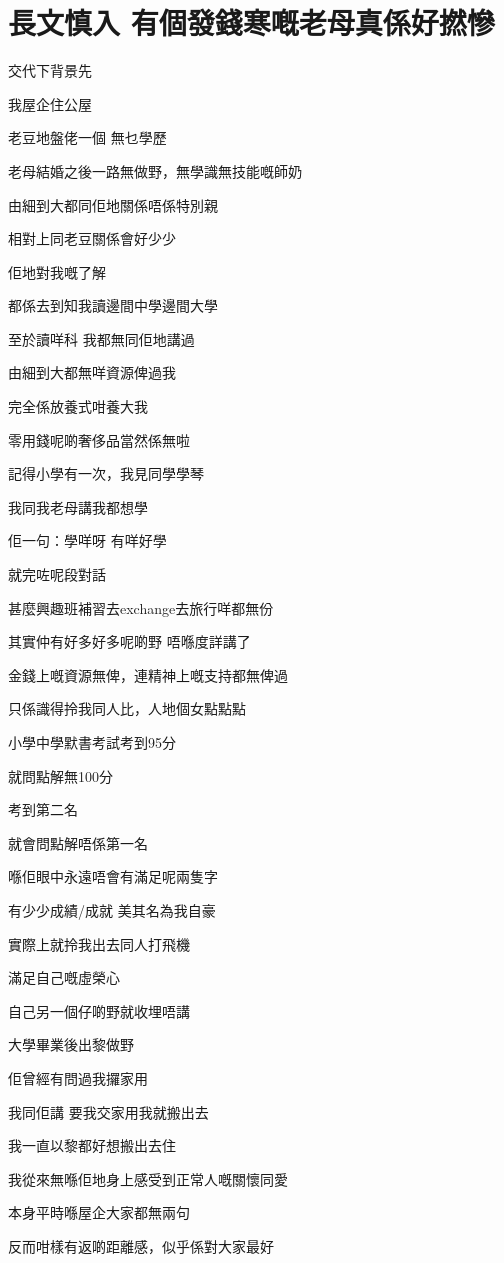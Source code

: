 \chapter{長文慎入 有個發錢寒嘅老母真係好撚慘}

交代下背景先

我屋企住公屋

老豆地盤佬一個 無乜學歷

老母結婚之後一路無做野，無學識無技能嘅師奶

由細到大都同佢地關係唔係特別親

相對上同老豆關係會好少少

佢地對我嘅了解

都係去到知我讀邊間中學邊間大學

至於讀咩科 我都無同佢地講過

由細到大都無咩資源俾過我

完全係放養式咁養大我

零用錢呢啲奢侈品當然係無啦

記得小學有一次，我見同學學琴

我同我老母講我都想學

佢一句：學咩呀 有咩好學

就完咗呢段對話

甚麼興趣班補習去exchange去旅行咩都無份

其實仲有好多好多呢啲野 唔喺度詳講了

金錢上嘅資源無俾，連精神上嘅支持都無俾過

只係識得拎我同人比，人地個女點點點

小學中學默書考試考到95分

就問點解無100分

考到第二名

就會問點解唔係第一名

喺佢眼中永遠唔會有滿足呢兩隻字

有少少成績/成就 美其名為我自豪

實際上就拎我出去同人打飛機

滿足自己嘅虛榮心

自己另一個仔啲野就收埋唔講

大學畢業後出黎做野

佢曾經有問過我攞家用

我同佢講 要我交家用我就搬出去

我一直以黎都好想搬出去住

我從來無喺佢地身上感受到正常人嘅關懷同愛

本身平時喺屋企大家都無兩句

反而咁樣有返啲距離感，似乎係對大家最好

